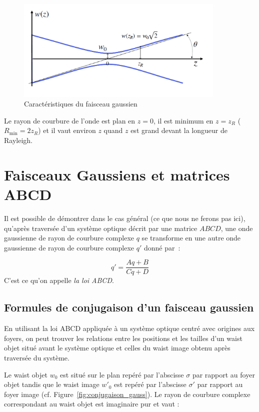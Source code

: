\documentclass[a4paper]{book}
\begin{document}
\begin{figure}[!htbp]
\begin{center}
\includegraphics[width=10cm]{pictures/gaussian.png}
\end{center}
\caption{Caractéristiques du faisceau gaussien}
\label{fig:carac_gauss}
\end{figure}

Le rayon de courbure de l'onde est plan en $z=0$, il est minimum en $z = z_R$ ($R_\textrm{min}=2z_R$) et il vaut environ $z$ quand $z$ est grand devant la longueur de Rayleigh.


\section{Faisceaux Gaussiens et matrices ABCD}

Il est possible de démontrer dans le cas général (ce que nous ne ferons pas ici), qu'après traversée d'un système optique décrit par une matrice $ABCD$, une onde gaussienne de rayon de courbure complexe $q$ se transforme en une autre onde gaussienne de rayon de courbure complexe $q'$ donné par~:

\begin{equation}
    q'=\frac{Aq+B}{Cq+D}
\end{equation}
C'est ce qu'on appelle \textit{la loi ABCD}.

\subsection{Formules de conjugaison d'un faisceau gaussien}

En utilisant la loi ABCD appliquée à un système optique centré avec origines aux foyers, on peut trouver les relations entre les positions et les tailles d'un waist objet situé avant le système optique et celles du waist image obtenu après traversée du système.


Le waist objet $w_0$ est situé sur le plan repéré par l'abscisse $\sigma$ par rapport au foyer objet tandis que le waist image $w'_0$ est repéré par l'abscisse $\sigma'$ par rapport au foyer image (cf. Figure~\ref{fig:conjugaison_gauss}). Le rayon de courbure complexe correspondant au waist objet est imaginaire pur et vaut :
\end{document}
